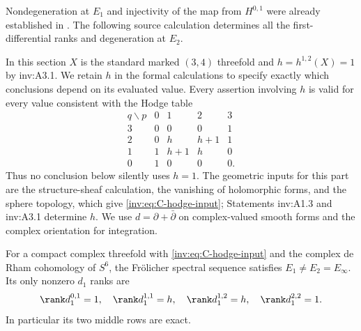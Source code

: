 Nondegeneration at $E_1$ and injectivity of the map from $H^{0,1}$ were already established in \cite[Corollary 9.22]{AC26}. The following source calculation determines all the first-differential ranks and degeneration at $E_2$.

\begin{definition}\label{inv:notation-hodge-input}
In this section $X$ is the standard marked $(3,4)$ threefold and
$h=h^{1,2}(X)=1$ by inv:A3.1.  We retain $h$ in the formal calculations
to specify exactly which conclusions depend on its evaluated value.
Every assertion involving $h$ is valid for every value
consistent with the Hodge table
\begin{equation}\label{inv:eq:C-hodge-input}
\begin{array}{c|rrrr}
q\backslash p&0&1&2&3\\\hline
3&0&0&0&1\\
2&0&h&h+1&1\\
1&1&h+1&h&0\\
0&1&0&0&0.
\end{array}
\end{equation}
Thus no conclusion below silently uses $h=1$.  The geometric inputs for
this part are the structure-sheaf calculation, the vanishing of
holomorphic forms, and the sphere topology, which give
\eqref{inv:eq:C-hodge-input}; Statements inv:A1.3 and inv:A3.1 determine $h$.
We use $d=\partial+\bar\partial$ on complex-valued
smooth forms and the complex orientation for integration.
\end{definition}

\begin{theorem}\label{inv:C1.1}
For a compact complex threefold with \eqref{inv:eq:C-hodge-input} and the
complex de Rham cohomology of $S^6$, the Fr\"olicher spectral sequence
satisfies $E_1\ne E_2=E_\infty$.  Its only nonzero $d_1$ ranks are
\[
\rank d_1^{0,1}=1,\quad \rank d_1^{1,1}=h,\quad
\rank d_1^{1,2}=h,\quad \rank d_1^{2,2}=1.
\]
In particular its two middle rows are exact.
\end{theorem}

